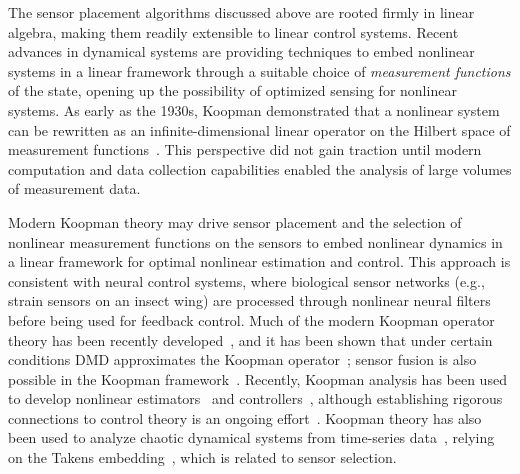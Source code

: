 \documentclass[letterpaper]{IEEEtran}
\begin{document}
The sensor placement algorithms discussed above are rooted firmly in linear algebra, making them readily extensible to linear control systems.  
Recent advances in dynamical systems are providing techniques to embed nonlinear systems in a linear framework through a suitable choice of \emph{measurement functions} of the state, opening up the possibility of optimized sensing for nonlinear systems.  
As early as the 1930s, Koopman demonstrated that a nonlinear system can be rewritten as an infinite-dimensional linear operator on the Hilbert space of measurement functions~\cite{Koopman1931pnas}.  
This perspective did not gain traction until modern computation and data collection capabilities enabled the analysis of large volumes of measurement data.  



Modern Koopman theory may drive sensor placement and the selection of nonlinear measurement functions on the sensors to embed nonlinear dynamics in a linear framework for optimal nonlinear estimation and control.  
This approach is consistent with neural control systems, where biological sensor networks (e.g., strain sensors on an insect wing) are processed through nonlinear neural filters before being used for feedback control.  
Much of the modern Koopman operator theory has been recently developed~\cite{Mezic2005nd,Budivsic2009cdc,Budivsic2012chaos,Mezic2013arfm}, and it has been shown that under certain conditions DMD approximates the Koopman operator~\cite{Schmid2010jfm,Rowley2009jfm,Tu2014jcd,Kutz2016book}; sensor fusion is also possible in the Koopman framework~\cite{Williams2015epl}.  
Recently, Koopman analysis has been used to develop nonlinear estimators~\cite{Surana2016cdc,Surana2016nolcos} and controllers~\cite{Brunton2016plosone}, although establishing rigorous connections to control theory is an ongoing effort~\cite{Proctor:2016DMDc,Proctor2016arxiv,Korda2016control}.  
Koopman theory has also been used to analyze chaotic dynamical systems from time-series data~\cite{Giannakis2015arxiv,Brunton2017natcomm}, relying on the Takens embedding~\cite{Takens1981lnm}, which is  related to sensor selection.  
\end{document}
